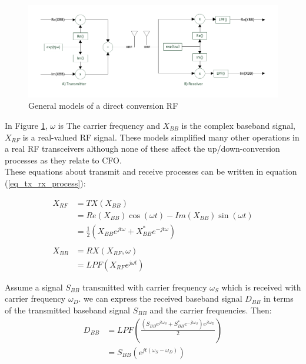 \begin{figure}[h!]
\centering
\includegraphics[width=\textwidth]{content/fig/drct_rf_mdl.pdf}
\caption{General models of a direct conversion RF}
\label{fig:cfo_radio_model}
\end{figure}

In Figure \ref{fig:cfo_radio_model}, $\omega$ is The carrier frequency and $X_{BB}$ is the complex baseband signal, $X_{RF}$ is
a real-valued RF signal. These models simplified many other operations in a real RF transceivers although none of these affect the up/down-conversion processes as they relate to CFO.\\
These equations about transmit and receive processes can be written in equation (\ref{eq_tx_rx_process}):

\begin{equation}\label{eq_tx_rx_process}
\begin{split}
X_{RF} & = TX(X_{BB})\\
& = Re(X_{BB})\cos(\omega t) - Im(X_{BB})\sin(\omega t)\\
& = \frac{1}{2} (X_{BB} e^{jt\omega} + X^{*}_{BB} e^{-jt\omega})\\
\\
X_{BB} & = RX(X_{RF}, \omega)\\
& = LPF(X_{RF} e^{j\omega t})
\end{split}
\end{equation}


Assume a signal $S_{BB}$ transmitted with carrier frequency $\omega_{S}$ which is received with carrier frequency $\omega_{D}$. we can express the received baseband signal $D_{BB}$ in terms of the transmitted baseband signal $S_{BB}$ and the carrier frequencies. Then:\\

\begin{equation} \label{DBB_SBB}
\begin{split}
D_{BB} & = LPF(\frac{(S_{BB} e^{jt\omega_{S}} + S^{*}_{BB} e^{-jt\omega_{S}})e^{jt\omega_{D}}}{2})\\
&= S_{BB}(e^{jt(\omega_{S}- \omega_{D})})
\end{split}
\end{equation}

